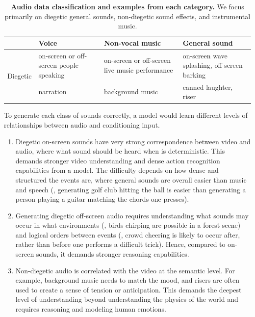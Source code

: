 \begin{table}[h]
    \centering
    \begin{tabular}{cp{100px}p{100px}p{100px}}
        \toprule
         & Voice & Non-vocal music & General sound \\
         \midrule
         \multirow{2}{*}{Diegetic} & on-screen or off-screen people speaking & on-screen or off-screen live music performance & on-screen wave splashing, off-screen barking \\
         \midrule
         Non-diegetic & narration & background music & canned laughter, riser \\
         \bottomrule
    \end{tabular}
    \caption{\textbf{Audio data classification and examples from each category.}
    We focus primarily on diegetic general sounds, non-diegetic sound effects, and instrumental music.
    }
    \label{tab:audio_data_class}
\end{table}

To generate each class of sounds correctly, a model would learn different levels of relationships between audio and conditioning input.
\begin{enumerate}
    \item Diegetic on-screen sounds have very strong correspondence between video and audio,
    where what sound should be heard when is deterministic.
    This demands stronger video understanding and dense action recognition capabilities from a model.
    The difficulty depends on how dense and structured the events are,
    where general sounds are overall easier than music and speech
    (\eg, generating golf club hitting the ball is easier than generating a person playing a guitar matching the chords one presses).
    \item Generating diegetic off-screen audio requires understanding what sounds may occur in what environments
    (\eg, birds chirping are possible in a forest scene) and logical orders between events (\eg, crowd cheering is likely to occur after, rather than before one performs a difficult trick).
    Hence, compared to on-screen sounds, it demands stronger reasoning capabilities.
    \item Non-diegetic audio is correlated with the video at the semantic level.
    For example, background music needs to match the mood,
    and risers are often used to create a sense of tension or anticipation.
    This demands the deepest level of understanding beyond understanding the physics of the world and requires reasoning and modeling human emotions.
\end{enumerate}

